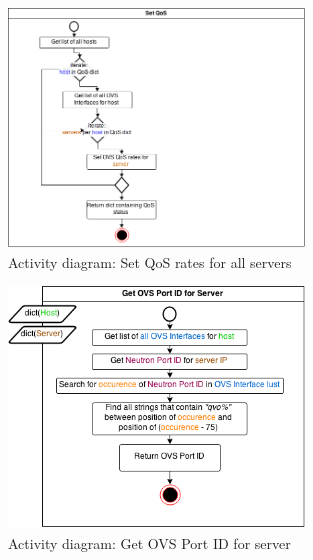 \begin{figure}[H]
\centering

\includegraphics[width=0.7\textwidth]{images/design/activity_set_qos}

\caption{Activity diagram: Set QoS rates for all servers}
\end{figure}

\begin{figure}[H]
\centering

\includegraphics[width=0.7\textwidth]{images/design/activity_get_ovs_port_server}

\caption{Activity diagram: Get OVS Port ID for server}
\end{figure}

